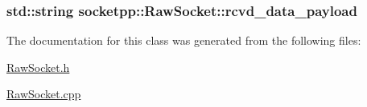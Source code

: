 \hypertarget{classsocketpp_1_1RawSocket_3e166c1c401c30b5721dc54f93772b36}{
\subsubsection[{rcvd\_\-data\_\-payload}]{\setlength{\rightskip}{0pt plus 5cm}std::string {\bf socketpp::RawSocket::rcvd\_\-data\_\-payload}}}
\label{classsocketpp_1_1RawSocket_3e166c1c401c30b5721dc54f93772b36}




The documentation for this class was generated from the following files:\begin{CompactItemize}
\item 
\hyperlink{RawSocket_8h}{RawSocket.h}\item 
\hyperlink{RawSocket_8cpp}{RawSocket.cpp}\end{CompactItemize}
